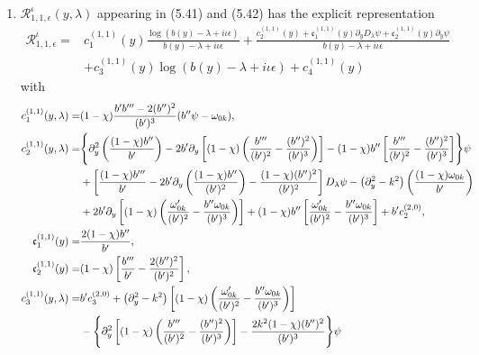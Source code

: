 \documentclass[reqno,11pt]{amsart}
\numberwithin{equation}{section}
\numberwithin{equation}{section} %
\begin{document}
\begin{enumerate}
\item $\mathcal{R}^\iota_{1,1,\epsilon}(y,\lambda)$ appearing in (5.41) and (5.42) has the explicit representation
    \begin{equation}\label{ndR11}
        \begin{split}
            \mathcal{R}^\iota_{1,1,\epsilon}=&c_1^{(1,1)}(y)\frac{\log(b(y)-\lambda+i\iota\epsilon)}{b(y)-\lambda+i\iota\epsilon}+\frac{c_2^{(1,1)}(y)+\mathfrak{c}_1^{(1,1)}(y)\partial_yD_\lambda\psi+\mathfrak{c}_2^{(1,1)}(y)\partial_y\psi}{b(y)-\lambda+i\iota\epsilon}\\
            &+c_{3}^{(1,1)}(y)\log(b(y)-\lambda+i\iota\epsilon)+c_4^{(1,1)}(y)
        \end{split}
    \end{equation}
    with
    \begin{align}
      c_1^{(1,1)}(y,\lambda)=&(1-\chi)\frac{b'b'''-2(b'')^2}{(b')^3}(b''\psi-\omega_{0k}),\notag\\
      c_2^{(1,1)}(y,\lambda)=&\Biggl\{\partial_y^2\left(\frac{(1-\chi)b''}{b'}\right)-2b'\partial_y\left[(1-\chi)
        \left(\frac{b'''}{(b')^2}-\frac{(b'')^2}{(b')^3}\right)\right]-(1-\chi)b''
        \left[\frac{b'''}{(b')^2}-\frac{(b'')^2}{(b')^3}\right]
        \Biggr\}\psi\notag\\
 &+\left[\frac{(1-\chi)b'''}{b'}
       -2b'\partial_y\left(\frac{(1-\chi)b''}{(b')^2}\right)
       -\frac{(1-\chi)(b'')^2}{(b')^2}\right]D_\lambda\psi-\bigl(\partial_y^2-k^2\bigr)
        \left(\frac{(1-\chi)\omega_{0k}}{b'}\right)\notag\\
 &+2b'\partial_y\left[(1-\chi)
        \left(\frac{\omega_{0k}'}{(b')^2}
                       -\frac{b''\omega_{0k}}{(b')^3}\right)\right]+(1-\chi)b''\left[\frac{\omega_{0k}'}{(b')^2}
                       -\frac{b''\omega_{0k}}{(b')^3}\right]+b'c_2^{(2,0)},\notag\\
      \mathfrak{c}_1^{(1,1)}(y)=&\frac{2(1-\chi)b''}{b'},\notag\\
      \mathfrak{c}_2^{(1,1)}(y)=&(1-\chi)\left[\frac{b'''}{b'}-\frac{2(b'')^2}{(b')^2}\right],\notag\\
      c_3^{(1,1)}(y,\lambda)=&b'c_3^{(2,0)}
 +\bigl(\partial_y^2-k^2\bigr)\left[(1-\chi)
        \left(\frac{\omega_{0k}'}{(b')^2}
                       -\frac{b''\omega_{0k}}{(b')^3}\right)\right]\notag\\
 &-\Biggl\{\partial_y^2\left[(1-\chi)
        \left(\frac{b'''}{(b')^2}-\frac{(b'')^2}{(b')^3}\right)\right]
        -\frac{2k^2(1-\chi)(b'')^2}{(b')^3}\Biggr\}\psi\notag\\

\end{align}
\end{enumerate}
\end{document}
